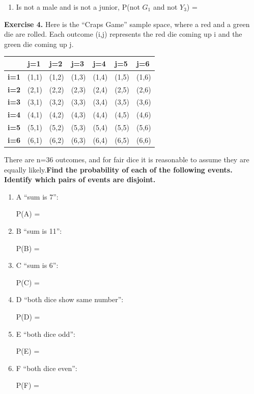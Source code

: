 \documentclass[
]{book}
\providecommand{\tightlist}{%
  \setlength{\itemsep}{0pt}\setlength{\parskip}{0pt}}
\begin{document}
\begin{enumerate}
\def\labelenumi{\alph{enumi})}
\setcounter{enumi}{4}
\tightlist
\item
  Is not a male and is not a junior, P(not \(G_1\) and not \(Y_3\)) =
\end{enumerate}

\textbf{Exercise 4.} Here is the ``Craps Game'' sample space, where a red and a green die are rolled. Each outcome (i,j) represents the red die coming up i and the green die coming up j.

\begin{longtable}[]{@{}lllllll@{}}
\toprule\noalign{}
& j=1 & j=2 & j=3 & j=4 & j=5 & j=6 \\
\midrule\noalign{}
\endhead
\bottomrule\noalign{}
\endlastfoot
\textbf{i=1} & (1,1) & (1,2) & (1,3) & (1,4) & (1,5) & (1,6) \\
\textbf{i=2} & (2,1) & (2,2) & (2,3) & (2,4) & (2,5) & (2,6) \\
\textbf{i=3} & (3,1) & (3,2) & (3,3) & (3,4) & (3,5) & (3,6) \\
\textbf{i=4} & (4,1) & (4,2) & (4,3) & (4,4) & (4,5) & (4,6) \\
\textbf{i=5} & (5,1) & (5,2) & (5,3) & (5,4) & (5,5) & (5,6) \\
\textbf{i=6} & (6,1) & (6,2) & (6,3) & (6,4) & (6,5) & (6,6) \\
\end{longtable}

There are n=36 outcomes, and for fair dice it is reasonable to assume they are equally likely.\textbf{Find the probability of each of the following events. Identify which pairs of events are disjoint.}

\begin{enumerate}
\def\labelenumi{(\alph{enumi})}
\item
  A ``sum is 7'':

  P(A) =
\item
  B ``sum is 11'':

  P(B) =
\item
  C ``sum is 6'':

  P(C) =
\item
  D ``both dice show same number'':

  P(D) =
\item
  E ``both dice odd'':

  P(E) =
\item
  F ``both dice even'':

  P(F) =
\end{enumerate}
\end{document}
